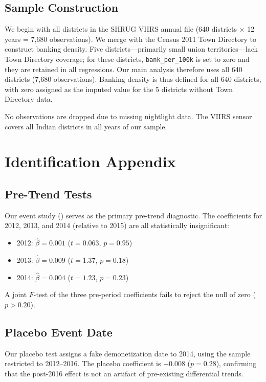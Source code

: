 \documentclass[12pt]{article}
\begin{document}
\subsection{Sample Construction}

We begin with all districts in the SHRUG VIIRS annual file (640 districts $\times$ 12 years = 7,680 observations). We merge with the Census 2011 Town Directory to construct banking density. Five districts---primarily small union territories---lack Town Directory coverage; for these districts, \texttt{bank\_per\_100k} is set to zero and they are retained in all regressions. Our main analysis therefore uses all 640 districts (7,680 observations). Banking density is thus defined for all 640 districts, with zero assigned as the imputed value for the 5 districts without Town Directory data.

No observations are dropped due to missing nightlight data. The VIIRS sensor covers all Indian districts in all years of our sample.

\section{Identification Appendix}\label{app:id}

\subsection{Pre-Trend Tests}

Our event study () serves as the primary pre-trend diagnostic. The coefficients for 2012, 2013, and 2014 (relative to 2015) are all statistically insignificant:

\begin{itemize}
\item 2012: $\hat{\beta} = 0.001$ ($t = 0.063$, $p = 0.95$)
\item 2013: $\hat{\beta} = 0.009$ ($t = 1.37$, $p = 0.18$)
\item 2014: $\hat{\beta} = 0.004$ ($t = 1.23$, $p = 0.23$)
\end{itemize}

A joint $F$-test of the three pre-period coefficients fails to reject the null of zero ($p > 0.20$).

\subsection{Placebo Event Date}

Our placebo test assigns a fake demonetization date to 2014, using the sample restricted to 2012--2016. The placebo coefficient is $-0.008$ ($p = 0.28$), confirming that the post-2016 effect is not an artifact of pre-existing differential trends.
\end{document}
